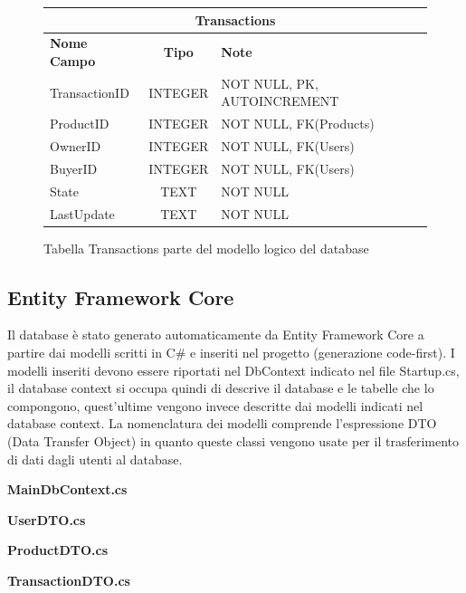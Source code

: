 \begin{figure}[ht]
    \centering\begin{tabular}{ |l|c|l| } 
    \hline
    \multicolumn{3}{|c|}{\large\textbf{Transactions}} \\
    \hline
    \textbf{Nome Campo} & \textbf{Tipo} & \textbf{Note} \\
    \hline
    TransactionID & INTEGER & NOT NULL, PK, AUTOINCREMENT \\
    ProductID & INTEGER & NOT NULL, FK(Products) \\
    OwnerID & INTEGER & NOT NULL, FK(Users) \\
    BuyerID & INTEGER & NOT NULL, FK(Users) \\
    State & TEXT & NOT NULL \\
    LastUpdate & TEXT & NOT NULL \\
    \hline
    \end{tabular}
    \caption{Tabella Transactions parte del modello logico del database}
\end{figure}
\clearpage
\subsection{Entity Framework Core}
Il database è stato generato automaticamente da Entity Framework Core a partire dai modelli scritti in C\# e inseriti nel progetto (generazione code-first). I modelli inseriti devono essere riportati nel DbContext indicato nel file Startup.cs, il database context si occupa quindi di descrive il database e le tabelle che lo compongono, quest'ultime vengono invece descritte dai modelli indicati nel database context. La nomenclatura dei modelli comprende l'espressione DTO (Data Transfer Object) in quanto queste classi vengono usate per il trasferimento di dati dagli utenti al database. 
\bigskip

\textbf{MainDbContext.cs}

\bigskip

\textbf{UserDTO.cs}

\bigskip

\textbf{ProductDTO.cs}

\bigskip

\textbf{TransactionDTO.cs}

